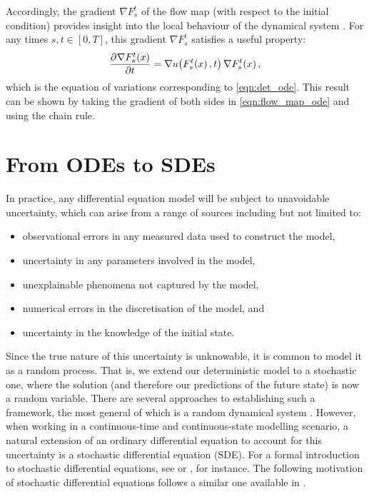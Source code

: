Accordingly, the gradient \(\nabla F_s^t\) of the flow map (with respect to the initial condition) provides insight into the local behaviour of the dynamical system \citep{Arnold_1973_OrdinaryDifferentialEquations,TruesdellNoll_2004_NonLinearFieldTheories}.
For any times \(s, t \in [0,T]\), this gradient	\(\nabla F_s^t\) satisfies a useful property:
\begin{equation}
	\dpd{\nabla F_{s}^{t}\!\left(x\right)}{t} = \nabla u\!\left(F_{s}^{t}\!\left(x\right), t\right) \nabla F_{s}^{t}\!\left(x\right),
	\label{eqn:eqn_of_variations}
\end{equation}
which is the equation of variations corresponding to \cref{eqn:det_ode}.
This result can be shown by taking the gradient of both sides in \cref{eqn:flow_map_ode} and using the chain rule.




\section{From ODEs to SDEs}
In practice, any differential equation model will be subject to unavoidable uncertainty, which can arise from a range of sources including but not limited to:
\begin{itemize}
	\item observational errors in any measured data used to construct the model,
	\item uncertainty in any parameters involved in the model,
	\item unexplainable phenomena not captured by the model,
	\item numerical errors in the discretisation of the model, and
	\item uncertainty in the knowledge of the initial state.
\end{itemize}
Since the true nature of this uncertainty is unknowable, it is common to model it as a random process.
That is, we extend our deterministic model to a stochastic one, where the solution (and therefore our predictions of the future state) is now a random variable.
There are several approaches to establishing such a framework, the most general of which is a random dynamical system \citep{Arnold_1998_RandomDynamicalSystems,NeckelRupp_2013_RandomDifferentialEquations}.
However, when working in a continuous-time and continuous-state modelling scenario, a natural extension of an ordinary differential equation to account for this uncertainty is a stochastic differential equation (SDE).
For a formal introduction to stochastic differential equations, see \citet{Oksendal_2003_StochasticDifferentialEquations} or \citet{KallianpurSundar_2014_StochasticAnalysisDiffusion}, for instance.
The following motivation of stochastic differential equations follows a similar one available in \citet{Oksendal_2003_StochasticDifferentialEquations}.

